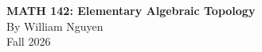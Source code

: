 \documentclass[10pt, oneside]{book}
\begin{document}
\frontmatter
\begin{titlepage}
    \centering
    \vspace*{8cm}

    {\Huge \textbf{MATH 142: Elementary Algebraic Topology}}\\[1cm]
    {\Large By William Nguyen}\\[0.5cm]
    {\large Fall 2026}\\
    \vfill
    
\end{titlepage}

\tableofcontents
\newpage
{}

\clearpage
\mainmatter
\pagestyle{plain}


\end{document}
